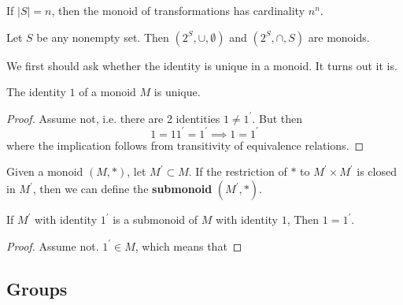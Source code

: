   \begin{theorem}
    If $|S| = n$, then the monoid of transformations has cardinality $n^n$. 
  \end{theorem}

  \begin{example}
    Let $S$ be any nonempty set. Then $(2^S, \cup, \emptyset)$ and $(2^S, \cap, S)$ are monoids. 
  \end{example}

  We first should ask whether the identity is unique in a monoid. It turns out it is. 

  \begin{lemma}
    The identity $1$ of a monoid $M$ is unique. 
  \end{lemma}
  \begin{proof}
    Assume not, i.e. there are 2 identities $1 \neq 1^\prime$. But then 
    \begin{equation}
      1 = 1 1^\prime = 1^\prime \implies 1 = 1^\prime
    \end{equation}
    where the implication follows from transitivity of equivalence relations. 
  \end{proof} 

  \begin{definition}[Submonoid]
    Given a monoid $(M, \ast)$, let $M^\prime \subset M$. If the restriction of $\ast$ to $M^\prime \times M^\prime$ is closed in $M^\prime$, then we can define the \textbf{submonoid} $(M^\prime, \ast)$. 
  \end{definition} 

  \begin{theorem}
    If $M^\prime$ with identity $1^\prime$ is a submonoid of $M$ with identity $1$, Then $1 = 1^\prime$. 
  \end{theorem}
  \begin{proof}
    Assume not. $1^\prime \in M$, which means that 
  \end{proof}

\subsection{Groups}
  

